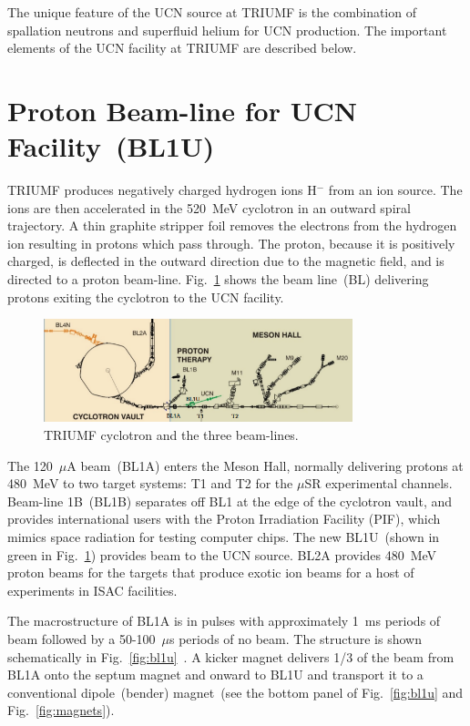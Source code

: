 The unique feature of the UCN source at TRIUMF is the combination of
spallation neutrons and superfluid helium for UCN production. The
important elements of the UCN facility at TRIUMF are described below.


\section{Proton Beam-line for UCN Facility~(BL1U)}
TRIUMF produces negatively charged hydrogen ions H$^-$ from an ion
source. The ions are then accelerated in the 520~MeV cyclotron in an
outward spiral trajectory. A thin graphite stripper foil removes the
electrons from the hydrogen ion resulting in protons which pass
through. The proton, because it is positively charged, is deflected in
the outward direction due to the magnetic field, and is directed to a
proton beam-line.
Fig.~\ref{fig:cyclotron} shows the beam line~(BL) delivering protons
exiting the cyclotron to the UCN facility.

\begin{figure}[h!]
  \centering
  \includegraphics[width=0.8\textwidth]{cyclotron.png}
  \caption{TRIUMF cyclotron and the three beam-lines.}
  \label{fig:cyclotron}
\end{figure}


The 120~$\mu$A beam~(BL1A) enters the Meson Hall, normally delivering
protons at 480~MeV to two target systems: T1 and T2 for the $\mu$SR
experimental channels. Beam-line 1B~(BL1B) separates off BL1 at the
edge of the cyclotron vault, and provides international users with the
Proton Irradiation Facility (PIF), which mimics space radiation for
testing computer chips. The new BL1U~(shown in green in
Fig.~\ref{fig:cyclotron}) provides beam to the UCN source. BL2A
provides 480~MeV proton beams for the targets that produce exotic ion
beams for a host of experiments in ISAC facilities.


The macrostructure of BL1A is in pulses with approximately 1~ms
periods of beam followed by a 50-100~$\mu$s periods of no beam. The
structure is shown schematically in
Fig.~\ref{fig:bl1u}~\cite{Nick_thesis}. A kicker magnet delivers 1/3
of the beam from BL1A onto the septum magnet and onward to BL1U and
transport it to a conventional dipole~(bender) magnet~(see the bottom
panel of Fig.~\ref{fig:bl1u} and Fig.~\ref{fig:magnets}).

